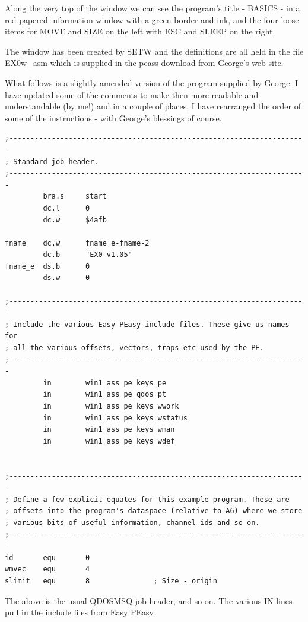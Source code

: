 Along the very top of the window we can see the program's title -{} BASICS -{}
        in a red papered information window with a green border and ink, and the four
        loose items for MOVE and SIZE on the left with ESC and SLEEP on the right.

The window has been created by SETW and the definitions are all held in the
        file EX0w\_asm which is supplied in the
 peass download from George's web site.

What follows is a slightly amended version of the program supplied by
        George. I have updated some of the comments to make then more readable and
        understandable (by me!) and in a couple of places, I have rearranged the order of
        some of the instructions -{} with George's blessings of course.

\begin{lstlisting}[firstnumber=1,caption={Ex0 - Standard Job Header}]
;----------------------------------------------------------------------
; Standard job header.
;----------------------------------------------------------------------
         bra.s     start
         dc.l      0
         dc.w      $4afb

fname    dc.w      fname_e-fname-2
         dc.b      "EX0 v1.05"
fname_e  ds.b      0
         ds.w      0

;----------------------------------------------------------------------
; Include the various Easy PEasy include files. These give us names for
; all the various offsets, vectors, traps etc used by the PE.
;----------------------------------------------------------------------
         in        win1_ass_pe_keys_pe
         in        win1_ass_pe_qdos_pt
         in        win1_ass_pe_keys_wwork
         in        win1_ass_pe_keys_wstatus
         in        win1_ass_pe_keys_wman
         in        win1_ass_pe_keys_wdef


;----------------------------------------------------------------------
; Define a few explicit equates for this example program. These are 
; offsets into the program's dataspace (relative to A6) where we store
; various bits of useful information, channel ids and so on.
;----------------------------------------------------------------------
id       equ       0
wmvec    equ       4
slimit   equ       8               ; Size - origin
\end{lstlisting}

The above is the usual QDOSMSQ job header, and so on. The various
 IN lines pull in the include files from Easy PEasy.

